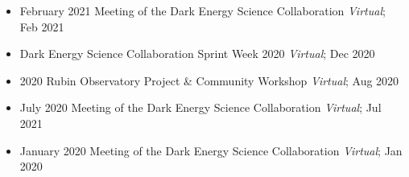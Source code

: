 \begin{itemize}
    \item February 2021 Meeting of the Dark Energy Science Collaboration \hfill \textit{Virtual}; Feb 2021
    \item Dark Energy Science Collaboration Sprint Week 2020 \hfill \textit{Virtual}; Dec 2020
    \item 2020 Rubin Observatory Project \& Community Workshop \hfill \textit{Virtual}; Aug 2020
    \item July 2020 Meeting of the Dark Energy Science Collaboration \hfill \textit{Virtual}; Jul 2021
    \item January 2020 Meeting of the Dark Energy Science Collaboration \hfill \textit{Virtual}; Jan 2020
\end{itemize}
